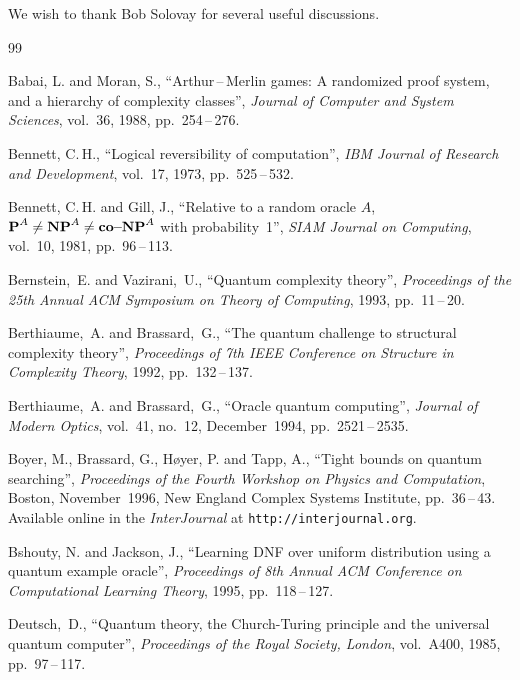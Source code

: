 We wish to thank Bob Solovay for several useful discussions.

\samepage\pagebreak[1]

\begin{thebibliography}{99}

Babai, L. and Moran, S.,
``Arthur\,--\,Merlin games: A randomized proof system, and a hierarchy
of complexity classes'',
{\em Journal of Computer and System Sciences},
vol.~36, 1988, pp.~254\,--\,276.
\suivant

Bennett, C.\,H.,
``Logical reversibility of computation'',
{\em IBM Journal of Research and Development},
vol.~17, 1973, \mbox{pp.~525\,--\,532}.
\suivant

Bennett, C.\,H. and Gill, J.,
``Relative to a random oracle $A$, $\mbox{\bf P}^A \neq \mbox{\bf NP}^A \neq \mbox{\bf co--NP}^A$
with probability~1'',
{\em SIAM Journal on Computing}, vol.~10, 1981, pp.~96\,--\,113.
\suivant

Bernstein,~E. and Vazirani,~U.,
``Quantum complexity theory'',
{\em Proceedings of the 25th Annual ACM Symposium on Theory of Computing},
1993, \mbox{pp.~11\,--\,20}.
\suivant

Berthiaume,~A. and Brassard,~G., ``The quantum challenge to structural
complexity theory'',
{\em Proceedings of 7th IEEE Conference on Structure in Complexity Theory},
1992, pp.~132\,--\,137.
\suivant

Berthiaume,~A. and Brassard,~G., ``Oracle quantum computing'',
{\em Journal of \mbox{Modern} Optics},
vol.~41, no.~12, December~1994, pp.~2521\,--\,2535.
\suivant

Boyer, M., Brassard, G., H{\o}yer, P. and Tapp, A.,
``Tight bounds on quantum \mbox{searching}'',
{\em Proceedings of the Fourth Workshop on Physics and Computation},
Boston, November~1996, New England Complex Systems Institute,
pp.~36\,--\,43.
Available online in the {\it InterJournal\/} at {\tt http://interjournal.org}.
\suivant

Bshouty, N. and Jackson, J.,
``Learning DNF over uniform distribution using a quantum example oracle'',
{\em Proceedings of 8th Annual ACM Conference
     on Computational Learning Theory},
1995, pp.~118\,--\,127.
\suivant

Deutsch,~D., ``Quantum theory, the Church-Turing principle and the
universal quantum computer'', {\em Proceedings of the Royal Society, London},
vol.~A400, 1985, pp.~97\,--\,117.
\suivant


\end{thebibliography}
